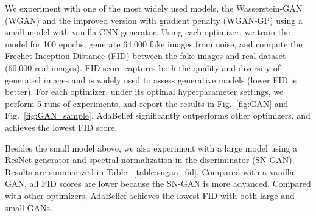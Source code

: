 \documentclass{article}
\begin{document}
We experiment with one of the most widely used models, the Wasserstein-GAN (WGAN) \cite{arjovsky2017wasserstein} and the improved version with gradient penalty (WGAN-GP) \cite{salimans2016improved} using a small model with vanilla CNN generator.  
Using each optimizer, we train the model for 100 epochs, generate 64,000 fake images from noise, and compute the Frechet Inception Distance (FID) \cite{heusel2017gans} between the fake images and real dataset (60,000 real images). 
FID score captures both the quality and diversity of generated images and is widely used to assess generative models (lower FID is better). %
For each optimizer, under its optimal hyperparameter settings, we perform 5 runs of experiments, and report the results in Fig.~\ref{fig:GAN} and Fig.~\ref{fig:GAN_sample}. AdaBelief significantly outperforms other optimizers, and achieves the lowest FID score.

Besides the small model above, we also experiment with a large model using a ResNet generator and spectral normalization in the discriminator (SN-GAN). Results are summarized in Table.~\ref{table:sngan_fid}. Compared with a vanilla GAN, all FID scores are lower because the SN-GAN is more advanced. Compared with other optimizers, AdaBelief achieves the lowest FID with both large and small GANs.

\end{document}
